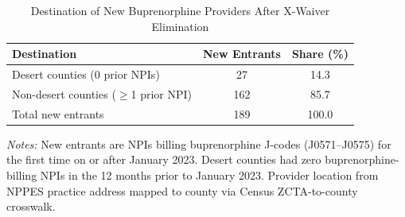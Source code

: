 \begin{table}[htbp]
\centering
\caption{Destination of New Buprenorphine Providers After X-Waiver Elimination}
\label{tab:destinations}
\begin{threeparttable}
\begin{tabular}{lcc}
\hline\hline
Destination & New Entrants & Share (\%) \\
\hline
Desert counties (0 prior NPIs) & 27 & 14.3 \\
Non-desert counties ($\geq$1 prior NPI) & 162 & 85.7 \\
\hline
Total new entrants & 189 & 100.0 \\
\hline\hline
\end{tabular}
\begin{tablenotes}[flushleft]\small
\item \textit{Notes:} New entrants are NPIs billing buprenorphine J-codes (J0571--J0575) for the first time on or after January 2023. Desert counties had zero buprenorphine-billing NPIs in the 12 months prior to January 2023. Provider location from NPPES practice address mapped to county via Census ZCTA-to-county crosswalk.
\end{tablenotes}
\end{threeparttable}
\end{table}
